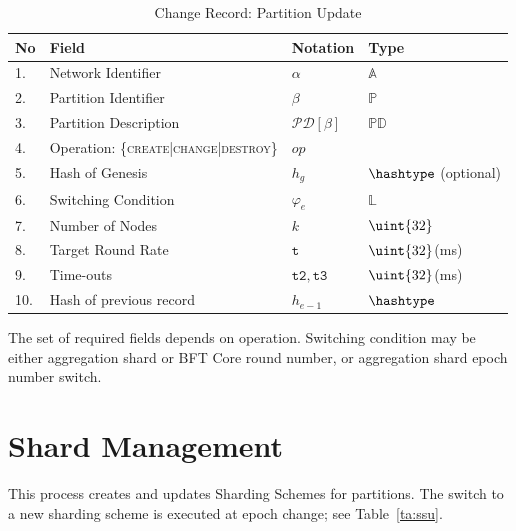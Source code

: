\begin{table}[!htbp]
	\begin{center}
		\caption{Change Record: Partition Update}\label{ta:pcr}
		\begin{tabular}{|p{0.6cm}|p{8cm}|p{1.7cm}|p{3.5cm}|}\hline
			No & Field                 & Notation & Type \\\hline\hline
			1. & Network Identifier    & $\alpha$ & $\mathbb{A}$       \\\hline
			2. & Partition Identifier  & $\beta$  & $\mathbb{P}$      \\\hline
			3. & Partition Description & $\mathcal{PD}[\beta]$ & $\mathbb{PD}$ \\\hline %
			4. & Operation: \{\textsc{create|change|destroy}\} & $op$   &  \\\hline
			5. & Hash of Genesis       & $h_g$    &  $\hashtype$ (optional)\\\hline
			6. & Switching Condition   & $\varphi_e$ & $\mathbb{L}$   \\\hline
			7. & Number of Nodes       & $k$      & $\uint{32}$       \\\hline
			8. & Target Round Rate     & $\mathtt{t}$ & $\uint{32}$(ms)    \\\hline
			9. & Time-outs             & $\mathtt{t2}, \mathtt{t3}$ & $\uint{32}$(ms)    \\\hline
			10. & Hash of previous record & $h_{e-1}$& $\hashtype$  \\\hline
		\end{tabular}
	\end{center}
\end{table}

The set of required fields depends on operation. Switching condition may be either aggregation shard or BFT Core round number, or aggregation shard epoch number switch.

\section{Shard Management}

This process creates and updates Sharding Schemes for partitions. The switch to a new sharding scheme is executed at epoch change; see Table~\ref{ta:ssu}.

